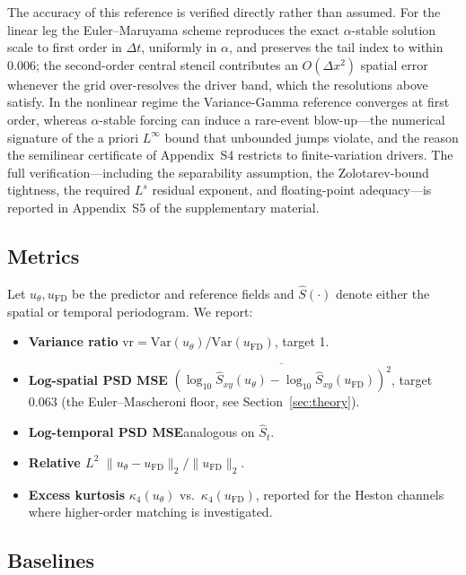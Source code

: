 \documentclass[review,12pt]{elsarticle}
\begin{document}
The accuracy of this reference is verified directly rather than
assumed. For the linear leg the Euler--Maruyama scheme reproduces the
exact $\alpha$-stable solution scale to first order in $\Delta t$,
uniformly in $\alpha$, and preserves the tail index to within $0.006$;
the second-order central stencil contributes an $O(\Delta x^2)$ spatial
error whenever the grid over-resolves the driver band, which the
resolutions above satisfy. In the nonlinear regime the Variance-Gamma
reference converges at first order, whereas $\alpha$-stable forcing can
induce a rare-event blow-up---the numerical signature of the a priori
$L^\infty$ bound that unbounded jumps violate, and the reason the
semilinear certificate of Appendix~S4 restricts to finite-variation
drivers. The full verification---including the separability assumption,
the Zolotarev-bound tightness, the required $L^s$ residual exponent, and
floating-point adequacy---is reported in Appendix~S5 of the
supplementary material.

\subsection{Metrics}
\label{subsec:metrics}

Let \(u_\theta, u_{\mathrm{FD}}\) be the predictor and reference
fields and \(\widehat S(\cdot)\) denote either the spatial or
temporal periodogram. We report:
\begin{itemize}
\item \textbf{Variance ratio}\quad
\(\mathrm{vr} = \mathrm{Var}(u_\theta)/\mathrm{Var}(u_{\mathrm{FD}})\),
target 1.
\item \textbf{Log-spatial PSD MSE}\quad
\(\overline{(\log_{10}\widehat S_{xy}(u_\theta) -
\log_{10}\widehat S_{xy}(u_{\mathrm{FD}}))^2}\), target 0.063
(the Euler--Mascheroni floor, see Section~\ref{sec:theory}).
\item \textbf{Log-temporal PSD MSE}\quad analogous on
\(\widehat S_t\).
\item \textbf{Relative \(L^2\)}\quad
\(\|u_\theta - u_{\mathrm{FD}}\|_2 / \|u_{\mathrm{FD}}\|_2\).
\item \textbf{Excess kurtosis}\quad
\(\kappa_4(u_\theta)\) vs.\ \(\kappa_4(u_{\mathrm{FD}})\), reported
for the Heston channels where higher-order matching is investigated.
\end{itemize}

\subsection{Baselines}
\end{document}
